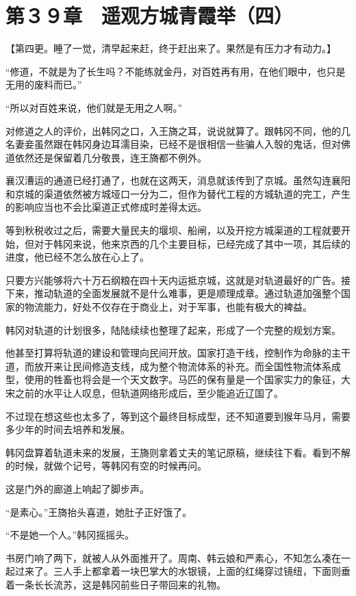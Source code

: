 \section{第３９章　遥观方城青霞举（四）}

【第四更。睡了一觉，清早起来赶，终于赶出来了。果然是有压力才有动力。】

“修道，不就是为了长生吗？不能练就金丹，对百姓再有用，在他们眼中，也只是无用的废料而已。”

“所以对百姓来说，他们就是无用之人啊。”

对修道之人的评价，出韩冈之口，入王旖之耳，说说就算了。跟韩冈不同，他的几名妻妾虽然跟在韩冈身边耳濡目染，已经不是很相信一些骗人入彀的鬼话，但对佛道依然还是保留着几分敬畏，连王旖都不例外。

襄汉漕运的通道已经打通了，也就在这两天，消息就该传到了京城。虽然勾连襄阳和京城的渠道依然被方城垭口一分为二，但作为替代工程的方城轨道的完工，产生的影响应当也不会比渠道正式修成时差得太远。

等到秋税收过之后，需要大量民夫的堰坝、船闸，以及开挖方城渠道的工程就要开始，但对于韩冈来说，他来京西的几个主要目标，已经完成了其中一项，其后续的进度，他已经不怎么放在心上了。

只要方兴能够将六十万石纲粮在四十天内运抵京城，这就是对轨道最好的广告。接下来，推动轨道的全面发展就不是什么难事，更是顺理成章。通过轨道加强整个国家的物流能力，好处不仅存在于商业上，对于军事，也能有极大的裨益。

韩冈对轨道的计划很多，陆陆续续也整理了起来，形成了一个完整的规划方案。

他甚至打算将轨道的建设和管理向民间开放。国家打造干线，控制作为命脉的主干道，而放开来让民间修造支线，成为整个物流体系的补充。而全国性物流体系成型，使用的牲畜也将会是一个天文数字。马匹的保有量是一个国家实力的象征，大宋之前的水平让人叹息，但轨道网络形成后，至少能追近辽国了。

不过现在想这些也太多了，等到这个最终目标成型，还不知道要到猴年马月，需要多少年的时间去培养和发展。

韩冈盘算着轨道未来的发展，王旖则拿着丈夫的笔记原稿，继续往下看。看到不解的时候，就做个记号，等韩冈有空的时候再问。

这是门外的廊道上响起了脚步声。

“是素心。”王旖抬头喜道，她肚子正好饿了。

“不是她一个人。”韩冈摇摇头。

书房门响了两下，就被人从外面推开了。周南、韩云娘和严素心，不知怎么凑在一起过来了。三人手上都拿着一块巴掌大的水银镜，上面的红绳穿过镜纽，下面则垂着一条长长流苏，这是韩冈前些日子带回来的礼物。

